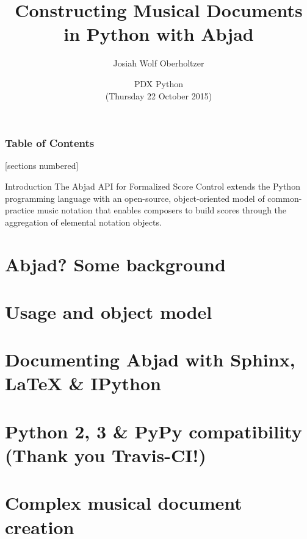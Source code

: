 \documentclass[10pt]{beamer}
\title{
    Constructing Musical Documents \protect\\
    in Python with Abjad
}
\subtitle{}
\author{
    Josiah Wolf Oberholtzer \inst{1} \and 
}
\institute[shortinst]{
    \inst{1}Department of Music, Harvard University
}
\date[]{
    PDX Python\protect\\ 
    (Thursday 22 October 2015)
}
\begin{document}
\maketitle

\begin{frame}
    \frametitle{Table of Contents}
    [sections numbered]
    \tableofcontents[hideallsubsections]
\end{frame}

\begin{frame}{Introduction}
The Abjad API for Formalized Score Control extends the Python programming
language with an open-source, object-oriented model of common-practice music
notation that enables composers to build scores through the aggregation of
elemental notation objects.
\end{frame}

\section{Abjad? Some background}

\section{Usage and object model}

\section{Documenting Abjad with Sphinx, LaTeX \& IPython}

\section{Python 2, 3 \& PyPy compatibility (Thank you Travis-CI!)}

\section{Complex musical document creation}
\end{document}

